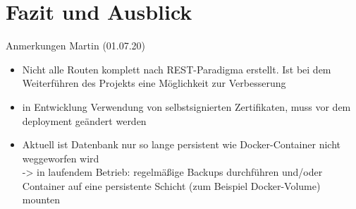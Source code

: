 \chapter{Fazit und Ausblick}
Anmerkungen Martin (01.07.20)
\begin{itemize}
	\item Nicht alle Routen komplett nach REST-Paradigma erstellt. Ist bei dem Weiterführen des Projekts eine Möglichkeit zur Verbesserung
	\item in Entwicklung Verwendung von selbstsignierten Zertifikaten, muss vor dem deployment geändert werden 
	\item Aktuell ist Datenbank nur so lange persistent wie Docker-Container nicht weggeworfen wird 
	\\ -> in laufendem Betrieb: regelmäßige Backups durchführen und/oder Container auf eine persistente Schicht (zum Beispiel Docker-Volume) mounten
\end{itemize}